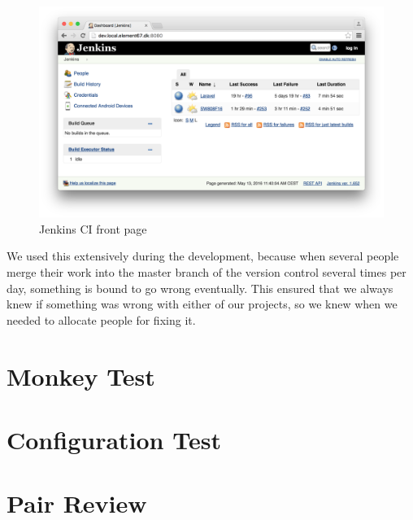 \begin{figure}[!htbp]
    \centering
    \includegraphics[width=\textwidth]{graphic/quality_assurance/jenkins_frontpage.png}
    \caption{Jenkins CI front page}
    \label{fig:jenkins_front_page}
\end{figure}
\FloatBarrier

We used this extensively during the development, because when several people merge their work into the master branch of the version control several times per day, something is bound to go wrong eventually. This ensured that we always knew if something was wrong with either of our projects, so we knew when we needed to allocate people for fixing it. 

\section{Monkey Test}
\label{sec:monkey_test}

\section{Configuration Test}
\label{sec:configuration_test}

\section{Pair Review}
\label{sec:pair_review}


